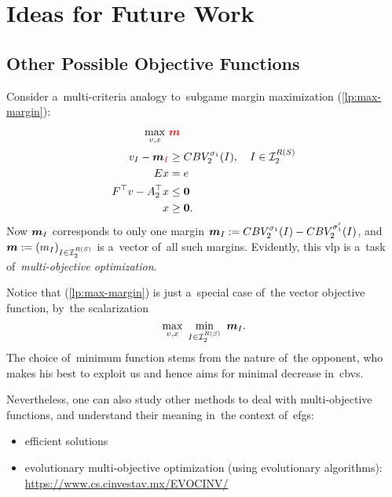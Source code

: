 \chapter{Ideas for Future Work}
\todo

\section{Other Possible Objective Functions}
Consider a~multi-criteria analogy to~subgame margin maximization (\ref{lp:max-margin}):
\begin{equation}
  \label{vlp:max-margins}
  \begin{split}
    \max_{v, x}\ &\textcolor{red}{\boldsymbol{m}} \\
    v_I - \boldsymbol{m}_{\textcolor{red}{I}} &\ge CBV_2^{\sigma_1}(I), \quad I \in \mathcal{I}_2^{R(S)}\\ 
    Ex &= e \\
    F^\top v - A_2^\top x &\le \boldsymbol{0} \\
    x &\ge \boldsymbol{0}.
  \end{split}
\end{equation}
Now $\boldsymbol{m}_I$ corresponds to only one margin $\boldsymbol{m}_I := CBV_2^{\sigma_1} (I) - CBV_2^{\sigma_1'} (I)$, and $\boldsymbol{m} := (m_I) _{I\in\mathcal{I}_2^{R(S)}}$ is a~vector of~all such margins.
Evidently, this \acrfull{vlp} is a~task of~\emph{multi-objective optimization}.

Notice that (\ref{lp:max-margin}) is just a~special case of~the vector objective function, by~the scalarization
\[
  \max_{v, x}\ \min_{I \in \I_2^{R(S)}}\ {\vect{m}_I}.
\]
The choice of~minimum function stems from the nature of~the opponent, who makes his best to exploit us and hence aims for minimal decrease in~\acrshort{cbv}s.

Nevertheless, one can also study other methods to deal with multi-objective functions, and understand their meaning in~the context of~\acrshort{efg}s:
\begin{itemize}
  \item efficient solutions
  \item evolutionary multi-objective optimization (using evolutionary algorithms):
    \href{https://www.cs.cinvestav.mx/~EVOCINV/}{https://www.cs.cinvestav.mx/\tilde EVOCINV/} %
\end{itemize}
\todo
